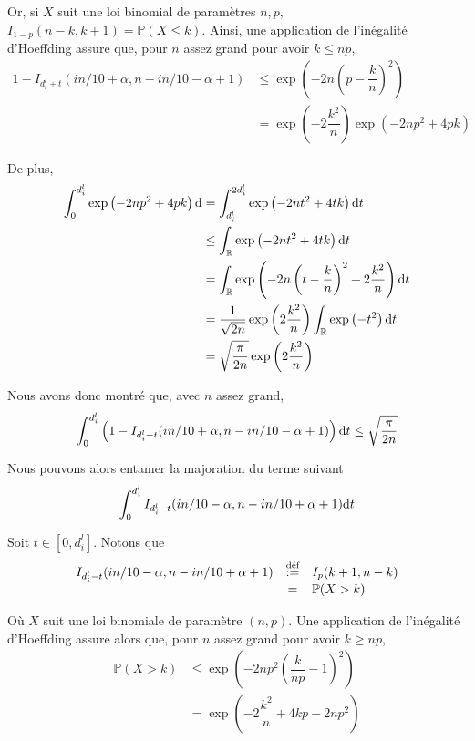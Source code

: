 Or, si \(X\) suit une loi binomial de paramètres \(n,p\), \(I_{1 - p}(n - k, k + 1)  = \mathbb P(X \leq k)\). Ainsi, une application de l'inégalité d'{\sc Hoeffding} assure que, pour \(n\) assez grand pour avoir \(k \leq np\), 
\begin{align*}
    1 - I_{d_i^l + t}(in/10 + \alpha, n - in/10 -  \alpha + 1) & \leq \exp\left( -2n\left( p - \dfrac{k}{n} \right)^2 \right)\\
    & = \exp\left( - 2\dfrac{k^2}{n} \right)\exp\left( -2np^2 + 4pk \right)
\end{align*}

De plus,
\begin{align*}
    \int_0^{d_i^l}\exp\left( -2np^2 + 4pk \right)\mathrm{d} & = \int_{d_i^l}^{{2d_i^l}}\exp\left( -2nt^2 + 4tk \right)\mathrm{d} t \\
    & \leq \int_{\mathbb{R}}\exp\left( -2nt^2 + 4tk \right)\mathrm{d} t \\
    & = \int_{\mathbb{R}}\exp\left( -2n\left(t - \dfrac{k}{n}\right)^2 + 2 \dfrac{k^2}{n} \right)\mathrm{d} t \\
    & = \dfrac{1}{\sqrt{2n}}\exp\left( 2 \dfrac{k^2}{n} \right) \int_{\mathbb{R}}\exp\left( -t^2 \right)\mathrm{d} t \\
    & = \sqrt{\dfrac{\pi}{2n}}\exp\left( 2 \dfrac{k^2}{n} \right)\\
\end{align*}

Nous avons donc montré que, avec \(n\) assez grand,
\begin{align}
    \int_{0}^{d_i^l}\left( 1 - I_{d_i^l + t}(in/10 + \alpha, n - in/10 -  \alpha + 1) \right) \mathrm{d} t     \leq \sqrt{\dfrac{\pi}{2n}}
\end{align}

Nous pouvons alors entamer la majoration du terme suivant 
\[
    \int_{0}^{d_i^l}I_{d_i^l - t}(in/10 - \alpha, n - in/10 +  \alpha + 1) \mathrm{d} t    
\]

Soit \(t \in [0, d_i^l]\). Notons que 
\[
    \begin{array}[]{rcl}
        I_{d_i^l - t}(in/10 - \alpha, n - in/10 +  \alpha + 1) & \overset{\text{déf}}{:=} & I_{p}(k+1, n - k)\\
        & = & \mathbb P(X > k)
    \end{array}    
\]

Où \(X\) suit une loi binomiale de paramètre \((n,p)\). Une application de l'inégalité d'{\sc Hoeffding} assure alors que, pour \(n\) assez grand pour avoir \(k \geq np\), 
\begin{align*}
    \mathbb P(X > k) & \leq \exp\left( -2np^2\left( \dfrac{k}{np} - 1 \right)^2 \right)\\
    & = \exp\left(  -2\dfrac{k^2}{n} +4kp  - 2np^2  \right)
\end{align*}

